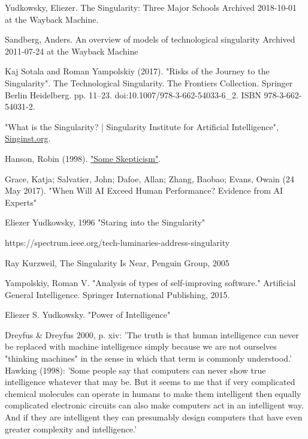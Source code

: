 \documentclass[a4paper]{article}
\begin{document}
\begin{thebibliography}{9}
  Yudkowsky, Eliezer. The Singularity: Three Major Schools Archived 2018-10-01 at the Wayback Machine.

 Sandberg, Anders. An overview of models of technological singularity Archived 2011-07-24 at the Wayback Machine

 Kaj Sotala and Roman Yampolskiy (2017). "Risks of the Journey to the Singularity". The Technological Singularity. The Frontiers Collection. Springer Berlin Heidelberg. pp. 11–23. doi:10.1007/978-3-662-54033-6\_2. ISBN 978-3-662-54031-2.

 "What is the Singularity? | Singularity Institute for Artificial Intelligence",  \href{https://web.archive.org/web/20110908014050/http://singinst.org/overview/whatisthesingularity/}{Singinst.org}.

 Hanson, Robin (1998). \href{https://mason.gmu.edu/~rhanson/vc.html#hanson}{"Some Skepticism"}.

 Grace, Katja; Salvatier, John; Dafoe, Allan; Zhang, Baobao; Evans, Owain (24 May 2017). "When Will AI Exceed Human Performance? Evidence from AI Experts"

 Eliezer Yudkowsky, 1996 "Staring into the Singularity"

 https://spectrum.ieee.org/tech-luminaries-address-singularity

 Ray Kurzweil, The Singularity Is Near, Penguin Group, 2005

 Yampolskiy, Roman V. "Analysis of types of self-improving software." Artificial General Intelligence. Springer International Publishing, 2015.

 Eliezer S. Yudkowsky. "Power of Intelligence"

 Dreyfus \& Dreyfus 2000, p. xiv: 'The truth is that human intelligence can never be replaced with machine intelligence simply because we are not ourselves "thinking machines" in the sense in which that term is commonly understood.' Hawking (1998): 'Some people say that computers can never show true intelligence whatever that may be. But it seems to me that if very complicated chemical molecules can operate in humans to make them intelligent then equally complicated electronic circuits can also make computers act in an intelligent way. And if they are intelligent they can presumably design computers that have even greater complexity and intelligence.'


\end{thebibliography}
\end{document}
